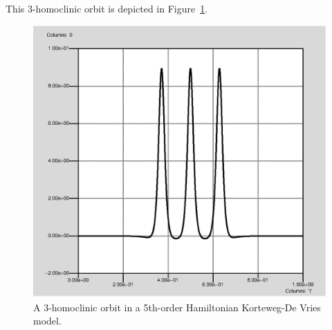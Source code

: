 This 3-homoclinic orbit is depicted in Figure~\ref{kdv3hom}.
\begin{figure}[htb]
\begin{center}
\includegraphics[scale=0.5]{include/kdv3hom.eps}
\caption{A 3-homoclinic orbit in a 5th-order Hamiltonian 
Korteweg-De Vries model.}
\label{kdv3hom}
\end{center}
\end{figure}










